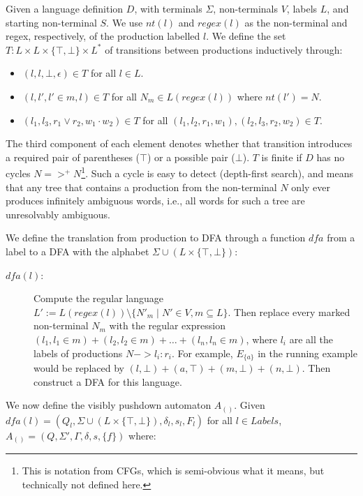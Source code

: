 \documentclass[acmsmall,review,anonymous]{acmart}\settopmatter{printfolios=true,printccs=false,printacmref=false}
\newcommand{\NT}{V} %
\newcommand{\T}{\Sigma} %
\newcommand{\Labels}{L} %
\newcommand{\pospl}{(}
\newcommand{\pospr}{)}
\newcommand{\posp}[1]{\pospl#1\pospr}
\newcommand{\dfa}{\mathit{dfa}} %
\newcommand{\labelnt}{\mathit{nt}} %
\newcommand{\labelregex}{\mathit{regex}} %
\begin{document}

Given a language definition $D$, with terminals $\T$, non-terminals $\NT$, labels $\Labels$, and starting non-terminal $S$. We use $\labelnt(l)$ and $\labelregex(l)$ as the non-terminal and regex, respectively, of the production labelled $l$. We define the set $T : \Labels \times \Labels \times \{\top, \bot\} \times \Labels^{*}$ of transitions between productions inductively through:

\begin{itemize}
\item $(l, l, \bot, \epsilon) \in T$ for all $l \in \Labels$.
\item $(l, l', l' \in m, l) \in T$ for all $N_m \in L(\labelregex(l))$ where $\labelnt(l') = N$.
\item $(l_1, l_3, r_1 \lor r_2, w_1 \cdot w_2) \in T$ for all $(l_1, l_2, r_1, w_1), (l_2, l_3, r_2, w_2) \in T$.
\end{itemize}

\noindent The third component of each element denotes whether that transition introduces a required pair of parentheses ($\top$) or a possible pair ($\bot$). $T$ is finite if $D$ has no cycles $N =>^{+} N$\footnote{This is notation from CFGs, which is semi-obvious what it means, but technically not defined here.}. Such a cycle is easy to detect (depth-first search), and means that any tree that contains a production from the non-terminal $N$ only ever produces infinitely ambiguous words, i.e., all words for such a tree are unresolvably ambiguous.

We define the translation from production to DFA through a function $\dfa$ from a label to a DFA with the alphabet $\T \cup (\Labels \times \{\top, \bot\})$:

\begin{description}
\item[$\dfa(l)$:] Compute the regular language $L' := L(\labelregex(l)) \setminus \{N'_m \mid N' \in \NT, m \subseteq \Labels\}$. Then replace every marked non-terminal $N_m$ with the regular expression $(l_1, l_1 \in m) + (l_2, l_2 \in m) + \ldots + (l_n, l_n \in m)$, where $l_i$ are all the labels of productions $N -> l_i : r_i$. For example, $E_{\{a\}}$ in the running example would be replaced by $(l, \bot) + (a, \top) + (m, \bot) + (n, \bot)$. Then construct a DFA for this language.
\end{description}

\noindent We now define the visibly pushdown automaton $A_{\posp{}}$. Given $\dfa(l) = (Q_l, \T \cup (\Labels \times \{\top, \bot\}), \delta_l, s_l, F_l)$ for all $l \in Labels$, $A_{\posp{}} = (Q, \T', \Gamma, \delta, s, \{f\})$ where:
\end{document}
